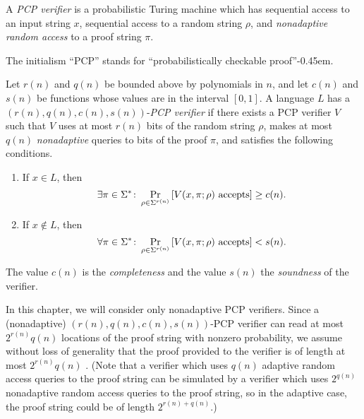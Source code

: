 \begin{definition}
  A \emph{PCP verifier} is a probabilistic Turing machine which has sequential access to an input string $x$, sequential access to a random string $\rho$, and \emph{nonadaptive random access} to a proof string $\pi$.
\end{definition}

The initialism ``PCP'' stands for ``probabilistically checkable proof''\kern-0.45em.

\begin{definition}
  Let $r(n)$ and $q(n)$ be bounded above by polynomials in $n$, and let $c(n)$ and $s(n)$ be functions whose values are in the interval $[0, 1]$.
  A language $L$ has a $(r(n), q(n), c(n), s(n))$-\emph{PCP verifier} if there exists a PCP verifier $V$ such that $V$ uses at most $r(n)$ bits of the random string $\rho$, makes at most $q(n)$ \emph{nonadaptive} queries to bits of the proof $\pi$, and satisfies the following conditions.
  \begin{enumerate}
  \item If $x \in L$, then
    \begin{equation*}
      \exists \pi \in \Sigma^* \colon \Pr_{\rho \in \Sigma^{r(n)}}{\left[V(x, \pi; \rho) \textnormal{ accepts}\right]} \geq c(n).
    \end{equation*}
  \item If $x \notin L$, then
    \begin{equation*}
      \forall \pi \in \Sigma^* \colon \Pr_{\rho \in \Sigma^{r(n)}}{\left[V(x, \pi; \rho) \textnormal{ accepts}\right]} < s(n).
    \end{equation*}
  \end{enumerate}
  The value $c(n)$ is the \emph{completeness} and the value $s(n)$ the \emph{soundness} of the verifier.
\end{definition}

In this chapter, we will consider only nonadaptive PCP verifiers.
Since a (nonadaptive) $(r(n), q(n), c(n), s(n))$-PCP verifier can read at most $2^{r(n)} q(n)$ locations of the proof string with nonzero probability, we assume without loss of generality that the proof provided to the verifier is of length at most $2^{r(n)} q(n)$ \autocite[Remark~11.6]{ab09}.
(Note that a verifier which uses $q(n)$ adaptive random access queries to the proof string can be simulated by a verifier which uses $2^{q(n)}$ nonadaptive random access queries to the proof string, so in the adaptive case, the proof string could be of length $2^{r(n) + q(n)}$.)

